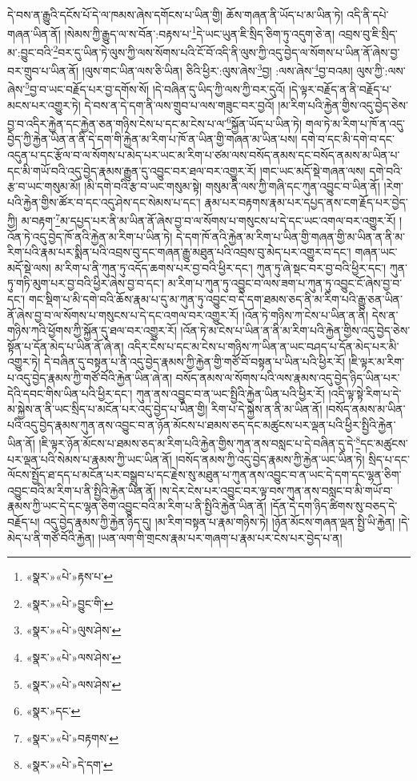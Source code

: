 དེ་བས་ན་རྒྱུའི་དངོས་པོ་དེ་ལ་ཁམས་ཞེས་དགོངས་པ་ཡིན་གྱི། ཆོས་གཞན་ནི་ཡོད་པ་མ་ཡིན་ཏེ། འདི་ནི་དཔེ་གཞན་ཡིན་ནོ། །སེམས་ཀྱི་རྒྱུད་ལ་ས་བོན་:བརྟས་པ་\footnote{«སྣར་»«པེ་»རྟས་པ་}དེ་ཡང་ཡུན་ཇི་སྲིད་ཅིག་ཏུ་འདུག་ཅེ་ན། འབྲས་བུ་ཇི་སྲིད་མ་:བྱུང་བའི་\footnote{«སྣར་»«པེ་»བྱུང་གི་}བར་དུ་ཡིན་ཏེ་ལུས་ཀྱི་ལས་སོགས་པའི་ངོ་བོ་འདི་ནི་ལུས་ཀྱི་འདུ་བྱེད་ལ་སོགས་པ་ཡིན་ནོ་ཞེས་བྱ་བར་གྲུབ་པ་ཡིན་ནོ། །ལུས་གང་ཡིན་ལས་ཅི་ཡིན། ཅིའི་ཕྱིར་:ལུས་ཞེས་\footnote{«སྣར་»«པེ་»ལུས་ཤེས་}བྱ། :ལས་ཞེས་\footnote{«སྣར་»«པེ་»ལས་ཤེས་}བྱ་བའམ། ལུས་ཀྱི་:ལས་ཞེས་\footnote{«སྣར་»«པེ་»ལས་ཤེས་}བྱ་བ་ཡང་བརྗོད་པར་བྱ་དགོས་སོ། །དེ་བཞིན་དུ་ཡིད་ཀྱི་ལས་ཀྱི་བར་དུའོ། །དེ་ལྟར་བརྗོད་ན་ནི་བརྗོད་པ་མངས་པར་འགྱུར་ཏེ། དེ་བས་ན་དེ་དག་ནི་ལས་གྲུབ་པ་ལས་གཟུང་བར་བྱའོ། །མ་རིག་པའི་རྐྱེན་གྱིས་འདུ་བྱེད་ཅེས་བྱ་བ་འདིར་རྐྱེན་དང་རྐྱེན་ཅན་གཉིས་ངེས་པ་དང་མ་ངེས་པ་ལ་\footnote{«སྣར་»དང་}སྐྱོན་ཡོད་པ་ཡིན་ཏེ། གལ་ཏེ་མ་རིག་པ་ཁོ་ན་འདུ་བྱེད་ཀྱི་རྐྱེན་ཡིན་ན་ནི་དེ་དག་གི་རྐྱེན་མ་རིག་པ་ཁོ་ན་ཡིན་གྱི་གཞན་མ་ཡིན་པས། དགེ་བ་དང་མི་དགེ་བ་དང་འདུན་པ་དང་རྩོལ་བ་ལ་སོགས་པ་མེད་པར་ཡང་མ་རིག་པ་ཙམ་ལས་བསོད་ནམས་དང་བསོད་ནམས་མ་ཡིན་པ་དང་མི་གཡོ་བའི་འདུ་བྱེད་རྣམས་རྒྱུན་དུ་འབྱུང་བར་ཐལ་བར་འགྱུར་རོ། །གང་ཡང་མདོ་སྡེ་གཞན་ལས། དགེ་བའི་རྩ་བ་ཡང་གསུམ་མོ། །མི་དགེ་བའི་རྩ་བ་ཡང་གསུམ་སྟེ། གསུམ་ནི་ལས་ཀྱི་གཞི་དང་ཀུན་འབྱུང་བ་ཡིན་ནོ། །རེག་པའི་རྐྱེན་གྱིས་ཚོར་བ་དང་འདུ་ཤེས་དང་སེམས་པ་དང་། རྣམ་པར་བརྟགས་རྣམ་པར་དཔྱད་ནས་ངག་རྗོད་པར་བྱེད་ཀྱི། མ་བརྟག་\footnote{«སྣར་»«པེ་»བརྟགས་}མ་དཔྱད་པར་ནི་མ་ཡིན་ནོ་ཞེས་བྱ་བ་ལ་སོགས་པ་གསུངས་པ་དེ་དང་ཡང་འགལ་བར་འགྱུར་རོ། །འོན་ཏེ་འདུ་བྱེད་ཁོ་ནའི་རྐྱེན་མ་རིག་པ་ཡིན་ཏེ། དེ་དག་ཁོ་ནའི་རྐྱེན་མ་རིག་པ་ཡིན་གྱི་གཞན་གྱི་མ་ཡིན་ན་ནི་མ་རིག་པའི་རྣམ་པར་སྨིན་པའི་འབྲས་བུ་དང་གཞན་རྒྱུ་མཐུན་པའི་འབྲས་བུ་མེད་པར་འགྱུར་བ་དང་། གཞན་ཡང་མདོ་སྡེ་ལས། མ་རིག་པ་ནི་ཀུན་ཏུ་འདོད་ཆགས་པར་བྱ་བའི་ཕྱིར་དང་། ཀུན་ཏུ་ཞེ་སྡང་བར་བྱ་བའི་ཕྱིར་དང་། ཀུན་ཏུ་གཏི་མུག་པར་བྱ་བའི་ཕྱིར་ཞེས་བྱ་བ་དང་། མ་རིག་པ་ཀུན་ཏུ་འབྱུང་བ་ལས་ཟག་པ་ཀུན་ཏུ་འབྱུང་ངོ་ཞེས་བྱ་བ་དང་། གང་སྡིག་པ་མི་དགེ་བའི་ཆོས་རྣམ་པ་དུ་མ་ཀུན་ཏུ་འབྱུང་བ་དེ་དག་ཐམས་ཅད་ནི་མ་རིག་པའི་རྒྱུ་ཅན་ཡིན་ནོ་ཞེས་བྱ་བ་ལ་སོགས་པ་གསུངས་པ་དེ་དང་འགལ་བར་འགྱུར་རོ། །འོན་ཏེ་གཉིས་ཀ་ངེས་པ་ཡིན་ན་ནི། དེས་ན་གཉིས་ཀའི་ཕྱོགས་ཀྱི་སྐྱོན་དུ་ཐལ་བར་འགྱུར་རོ། །འོན་ཏེ་མ་ངེས་པ་ཡིན་ན་ནི་མ་རིག་པའི་རྐྱེན་གྱིས་འདུ་བྱེད་ཅེས་སྟོན་པ་དོན་མེད་པ་ཡིན་ནོ་ཞེ་ན། འདིར་ངེས་པ་དང་མ་ངེས་པ་གཉིས་ཀ་ཡིན་ན་ཡང་བཤད་པ་དོན་མེད་པར་མི་འགྱུར་ཏེ། དེ་བཞིན་དུ་བསྟན་པ་ནི་འདུ་བྱེད་རྣམས་ཀྱི་རྐྱེན་གྱི་གཙོ་བོ་བསྟན་པ་ཡིན་པའི་ཕྱིར་རོ། །ཇི་ལྟར་མ་རིག་པ་འདུ་བྱེད་རྣམས་ཀྱི་གཙོ་བོའི་རྐྱེན་ཡིན་ཞེ་ན། བསོད་ནམས་ལ་སོགས་པའི་ལས་རྣམས་འདུ་བྱེད་ཉིད་ཡིན་པར་དེའི་དབང་གིས་ཡིན་པའི་ཕྱིར་དང་། ཀུན་ནས་འབྱུང་བ་ན་ཡང་སྤྱིའི་རྐྱེན་ཡིན་པའི་ཕྱིར་རོ། །འདི་ལྟ་སྟེ་རིག་པ་དེ་མ་སྐྱེས་ན་ནི་ཡང་སྲིད་པ་མངོན་པར་འདུ་བྱེད་པ་ཡིན་གྱི། རིག་པ་དེ་སྐྱེས་ན་ནི་མ་ཡིན་ནོ། །བསོད་ནམས་མ་ཡིན་པའི་འདུ་བྱེད་རྣམས་ཀུན་ནས་འབྱུང་བ་ན་ཉོན་མོངས་པ་ཐམས་ཅད་དང་མཚུངས་པར་ལྡན་པའི་ཕྱིར་སྤྱིའི་རྐྱེན་ཡིན་ནོ། །ཇི་ལྟར་ཉོན་མོངས་པ་ཐམས་ཅད་མ་རིག་པའི་རྐྱེན་གྱིས་ཀུན་ནས་བསླང་པ་དེ་བཞིན་དུ་དེ་\footnote{«སྣར་»«པེ་»དེ་དག་}དང་མཚུངས་པར་ལྡན་པའི་སེམས་པ་རྣམས་ཀྱི་ཡང་ཡིན་ནོ། །བསོད་ནམས་ཀྱི་འདུ་བྱེད་རྣམས་ཀྱི་རྐྱེན་ཡང་ཡིན་ཏེ། སྲིད་པ་དང་ལོངས་སྤྱོད་ཐ་དད་པ་མངོན་པར་བསྒྲུབ་པ་དང་རྗེས་སུ་མཐུན་པ་ཀུན་ནས་འབྱུང་བ་ན་ཡང་དེ་དག་དང་ལྷན་ཅིག་འབྱུང་བའི་མ་རིག་པ་ནི་སྤྱིའི་རྐྱེན་ཡིན་ནོ། །ས་དེར་ངེས་པར་འབྱུང་བར་ལྟ་བས་ཀུན་ནས་བསླང་བ་མི་གཡོ་བ་རྣམས་ཀྱི་ཡང་དེ་དང་ལྷན་ཅིག་འབྱུང་བའི་མ་རིག་པ་ནི་སྤྱིའི་རྐྱེན་ཡིན་ནོ། །དོན་དེ་དག་ཉིད་ཚིགས་སུ་བཅད་དེ་བརྗོད་པ། འདུ་བྱེད་རྣམས་ཀྱི་རྐྱེན་ཉིད་དུ། །མ་རིག་བསྟན་པ་རྣམ་གཉིས་ཏེ། །ཉོན་མོངས་གཞན་ལྡན་སྤྱི་ཡི་རྐྱེན། །དེ་མེད་པ་ནི་གཙོ་བོའི་རྐྱེན། །ཡན་ལག་གི་གྲངས་རྣམ་པར་གཞག་པ་རྣམ་པར་ངེས་པར་བྱེད་པ་ན། 